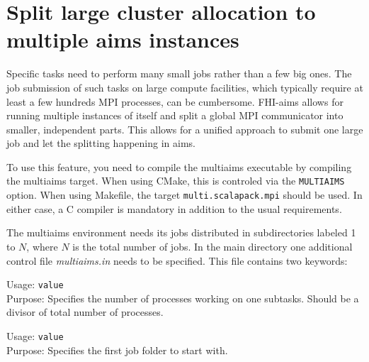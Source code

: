 \chapter[Multiple Instances of Aims]{Split large cluster allocation to multiple
aims instances}
\label{appendix_multiaims}

Specific tasks need to perform many small jobs rather than a few big ones. The
job submission of such tasks on large compute facilities, which typically require
at least a few hundreds MPI processes, can be cumbersome. FHI-aims allows for
running multiple instances of itself and split a global MPI communicator into
smaller, independent parts. This allows for a unified approach to submit one
large job and let the splitting happening in aims.

To use this feature, you need to compile the multiaims executable by compiling
the multiaims target. When using CMake, this is controled via the
\texttt{MULTIAIMS} option. When using Makefile, the target
\texttt{multi.scalapack.mpi} should be used. In either case, a C compiler is
mandatory in addition to the usual requirements.

The multiaims environment needs its jobs distributed in subdirectories labeled
1 to $N$, where $N$ is the total number of jobs. In the main directory one
additional control file \textit{multiaims.in} needs to be specified. This file
contains two keywords:

{
  \noindent
  Usage:  \texttt{value} \\[1.0ex]
  Purpose: Specifies the number of processes working on one subtasks. Should be
    a divisor of total number of processes.
}

{
  \noindent
  Usage:  \texttt{value} \\[1.0ex]
  Purpose: Specifies the first job folder to start with.
}

